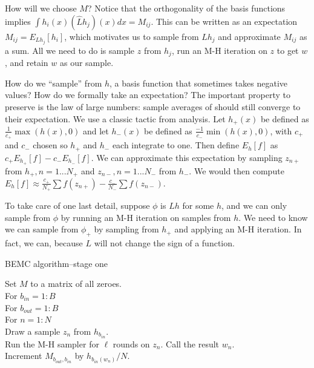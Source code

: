 \documentclass{article}
\begin{document}
How will we choose $M$? Notice that the orthogonality of the basis functions implies $\int h_i(x)(\hat{L}h_j)(x)dx =  M_{ij}$. This can be written as an expectation $M_{ij} = E_{Lh_j}[h_i]$, which motivates us to sample from $Lh_j$ and approximate $M_{ij}$ as a sum. All we need to do is sample $z$ from $h_j$, run an M-H iteration on $z$ to get $w$, and retain $w$ as our sample. 

How do we ``sample'' from $h$, a basis function that sometimes takes negative values? How do we formally take an expectation? The important property to preserve is the law of large numbers: sample averages of should still converge to their expectation. We use a classic tactic from analysis. Let $h_+(x)$ be defined as $\frac{1}{c_+}\max(h(x), 0)$ and let $h_-(x)$ be defined as $\frac{-1}{c_-}\min(h(x), 0)$, with $c_+$ and $c_-$ chosen so $h_+$ and $h_-$ each integrate to one. Then define $E_{h}[f]$ as $c_+E_{h_+}[f]-c_-E_{h_-}[f]$. We can approximate this expectation by sampling $z_{n+}$ from $h_+, n=1...N_+$ and $z_{n-}, n=1...N_-$ from $h_-$. We would then compute $E_{h}[f] \approx \frac{c_+}{N_+}\sum f(z_{n+})-\frac{c_-}{N_-}\sum f(z_{n-})$. %

To take care of one last detail, suppose $\phi$ is $Lh$ for some $h$, and we can only sample from $\phi$ by running an M-H iteration on samples from $h$. We need to know we can sample from $\phi_+$ by sampling from $h_+$ and applying an M-H iteration. In fact, we can, because $L$ will not change the sign of a function. 

\begin{algorithm}[h]
\caption{BEMC algorithm--stage one}
Set $M$ to a matrix of all zeroes.\\
For $b_{in}  = 1:B$\\
\Indp
For $b_{out}  = 1:B$\\
\Indp
For $n = 1:N$\\
\Indp
Draw a sample $z_n$ from $h_{b_{in}}$.\\
Run the M-H sampler for $\ell$ rounds on $z_n$. Call the result $w_n$.\\
Increment $M_{b_{out}, b_{in}}$ by $h_{b_{in}(w_n)}/N$.\\
\Indm
\Indm
\Indm

\end{algorithm}
\end{document}
